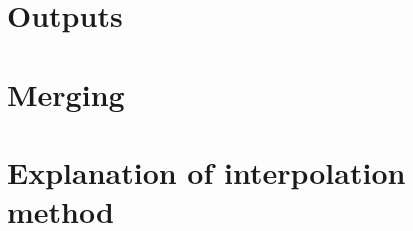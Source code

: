 \documentclass{article}
\begin{document}
\section{Outputs}

\section{Merging}

\section{Explanation of interpolation method}
\end{document}
